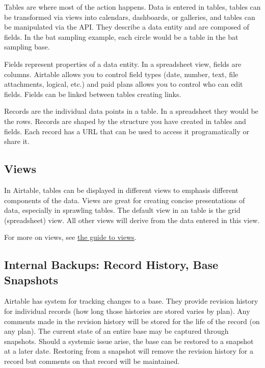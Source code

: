 \documentclass[
]{book}
\begin{document}
Tables are where most of the action happens. Data is entered in tables, tables can be transformed via views into calendars, dashboards, or galleries, and tables can be manipulated via the API. They describe a data entity and are composed of fields. In the bat sampling example, each circle would be a table in the bat sampling base.

Fields represent properties of a data entity. In a spreadsheet view, fields are columns. Airtable allows you to control field types (date, number, text, file attachments, logical, etc.) and paid plans allows you to control who can edit fields. Fields can be linked between tables creating links.

Records are the individual data points in a table. In a spreadsheet they would be the rows. Records are shaped by the structure you have created in tables and fields. Each record has a URL that can be used to access it programatically or share it.

\hypertarget{views}{%
\subsection{Views}\label{views}}

In Airtable, tables can be displayed in different views to emphasis different components of the data. Views are great for creating concise presentations of data, especially in sprawling tables. The default view in an table is the grid (spreadsheet) view. All other views will derive from the data entered in this view.

For more on views, see \href{https://support.airtable.com/hc/en-us/articles/202624989-Guide-to-views}{the guide to views}.

\hypertarget{internal-backups-record-history-base-snapshots}{%
\subsection{Internal Backups: Record History, Base Snapshots}\label{internal-backups-record-history-base-snapshots}}

Airtable has system for tracking changes to a base. They provide revision history for individual records (how long those histories are stored varies by plan). Any comments made in the revision history will be stored for the life of the record (on any plan). The current state of an entire base may be captured through snapshots. Should a systemic issue arise, the base can be restored to a snapshot at a later date. Restoring from a snapshot will remove the revision history for a record but comments on that record will be maintained.
\end{document}

